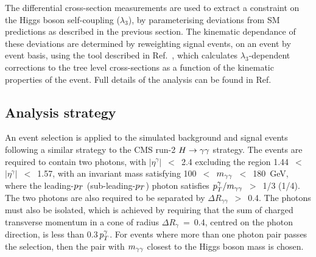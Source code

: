 The differential cross-section measurements are used to extract a 
constraint on the Higgs boson self-coupling ($\lambda_{3}$), by parameterising deviations from SM predictions as described in the previous section. The kinematic dependance of these deviations are determined by reweighting signal events, on an event by event basis,  using the tool described in Ref.~\cite{EWreweightingtool}, which calculates $\lambda_3$-dependent corrections to the tree level cross-sections as a function of the kinematic properties of the event.  Full details of the analysis can be found in Ref.~\cite{REF TO CMS PAS}


\subsection{Analysis strategy}

An event selection is applied to the simulated background and signal events following a similar strategy to the CMS run-2 $H\rightarrow\gamma\gamma$ strategy. The events are required to contain two photons, with $|\eta^\gamma|$~$<$~2.4 excluding the region 1.44~$<$~$|\eta^\gamma|$~$<$~1.57, with an invariant mass satisfying 100~$<$~$m_{\gamma\gamma}$~$<$~180~GeV, where the leading-$p_{T}$ (sub-leading-$p_{T}$) photon satisfies $p_{T}^{\gamma}/m_{\gamma\gamma}$~$>$~1/3 (1/4). The two photons are also required to be separated by $\Delta R_{\gamma\gamma}$~$>$~0.4. The photons must also be isolated, which is achieved by requiring that the sum of charged transverse momentum in a cone of radius $\Delta R_{\gamma}$~=~0.4, centred on the photon direction, is less than 0.3$\, p_{T}^\gamma$. For events where more than one photon pair passes the selection, then the pair with $m_{\gamma\gamma}$ closest to the Higgs boson mass is chosen.

